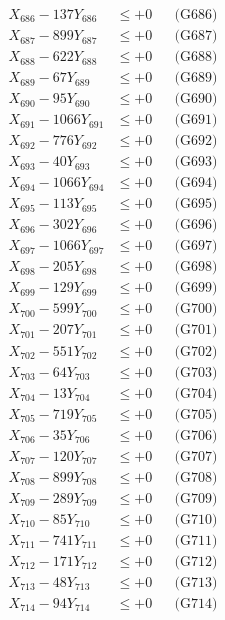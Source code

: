 \documentclass[a4paper,10pt]{article}
\begin{document}
{\begin{align}
X_{686} - 137Y_{686} &\leq +0 && \text{(G686)} \\
X_{687} - 899Y_{687} &\leq +0 && \text{(G687)} \\
X_{688} - 622Y_{688} &\leq +0 && \text{(G688)} \\
X_{689} - 67Y_{689} &\leq +0 && \text{(G689)} \\
X_{690} - 95Y_{690} &\leq +0 && \text{(G690)} \\
\allowbreak
X_{691} - 1066Y_{691} &\leq +0 && \text{(G691)} \\
X_{692} - 776Y_{692} &\leq +0 && \text{(G692)} \\
X_{693} - 40Y_{693} &\leq +0 && \text{(G693)} \\
X_{694} - 1066Y_{694} &\leq +0 && \text{(G694)} \\
X_{695} - 113Y_{695} &\leq +0 && \text{(G695)} \\
X_{696} - 302Y_{696} &\leq +0 && \text{(G696)} \\
X_{697} - 1066Y_{697} &\leq +0 && \text{(G697)} \\
X_{698} - 205Y_{698} &\leq +0 && \text{(G698)} \\
X_{699} - 129Y_{699} &\leq +0 && \text{(G699)} \\
X_{700} - 599Y_{700} &\leq +0 && \text{(G700)} \\
\allowbreak
X_{701} - 207Y_{701} &\leq +0 && \text{(G701)} \\
X_{702} - 551Y_{702} &\leq +0 && \text{(G702)} \\
X_{703} - 64Y_{703} &\leq +0 && \text{(G703)} \\
X_{704} - 13Y_{704} &\leq +0 && \text{(G704)} \\
X_{705} - 719Y_{705} &\leq +0 && \text{(G705)} \\
X_{706} - 35Y_{706} &\leq +0 && \text{(G706)} \\
X_{707} - 120Y_{707} &\leq +0 && \text{(G707)} \\
X_{708} - 899Y_{708} &\leq +0 && \text{(G708)} \\
X_{709} - 289Y_{709} &\leq +0 && \text{(G709)} \\
X_{710} - 85Y_{710} &\leq +0 && \text{(G710)} \\
\allowbreak
X_{711} - 741Y_{711} &\leq +0 && \text{(G711)} \\
X_{712} - 171Y_{712} &\leq +0 && \text{(G712)} \\
X_{713} - 48Y_{713} &\leq +0 && \text{(G713)} \\
X_{714} - 94Y_{714} &\leq +0 && \text{(G714)} \\

\end{align}}
\end{document}
